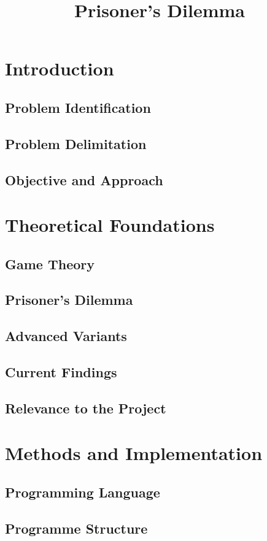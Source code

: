 \documentclass[10pt, a4paper, twocolomn]{article}
\begin{document}
\title{Prisoner's Dilemma}
\tableofcontents

\section{Introduction}
	\subsection{Problem Identification}
	\subsection{Problem Delimitation}
	\subsection{Objective and Approach}

\section{Theoretical Foundations}
	\subsection{Game Theory}
	\subsection{Prisoner's Dilemma}
	\subsection{Advanced Variants}
	\subsection{Current Findings}
	\subsection{Relevance to the Project}

\section{Methods and Implementation}
	\subsection{Programming Language}
	\subsection{Programme Structure}
\end{document}

